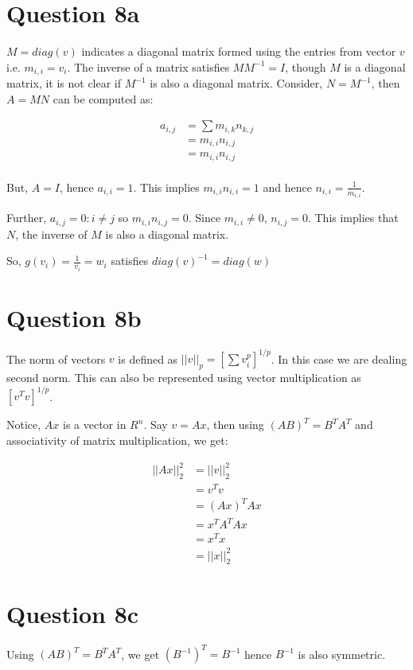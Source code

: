 \documentclass{article}
\begin{document}
    \section*{Question 8a}
    $M = diag(v)$ indicates a diagonal matrix formed using the entries from vector $v$ i.e. $m_{i,i} = v_i$. The inverse of a matrix satisfies $MM^{-1} = I$, though $M$ is a diagonal matrix, it is not clear if $M^{-1}$ is also a diagonal matrix. Consider, $N = M^{-1}$, then $A = MN$ can be computed as:

    \begin{align*}
        a_{i,j} &= \sum m_{i,k}n_{k,j} \\
                &= m_{i,i}n_{i,j} \\
                &= m_{i,i}n_{i,j} \\
    \end{align*}

    But, $A = I$, hence $a_{i, i} = 1$. This implies $m_{i, i}n_{i, i} = 1$ and hence $n_{i, i} = \frac{1}{m_{i,i}}$.
    
    Further, $a_{i,j} = 0 : i \neq j$ so $m_{i, i}n_{i, j} = 0$. Since $m_{i, i} \neq 0$, $n_{i, j} = 0$. This implies that $N$, the inverse of $M$ is also a diagonal matrix.

    So, $g(v_i) = \frac{1}{v_i} = w_i$ satisfies $diag(v)^{-1} = diag(w)$

    \section*{Question 8b}
    The norm of vectors $v$ is defined as $||v||_p = [\sum v_i^{p}]^{1/p}$. In this case we are dealing second norm. This can also be represented using vector multiplication as $[v^{T}v]^{1/p}$.
    
    Notice, $Ax$ is a vector in $R^n$. Say $v = Ax$, then using $(AB)^{T} = B^TA^T$ and associativity of matrix multiplication, we get:

    \begin{align*}
        ||Ax||_2^2  &= ||v||_2^2 \\
                    &= v^{T}v \\
                    &= (Ax)^{T}Ax \\
                    &= x^{T}A^{T}Ax \\
                    &= x^{T}x \\
                    &= ||x||_2^2
    \end{align*}

    \section*{Question 8c}
    Using $(AB)^T = B^TA^T$, we get $(B^{-1})^T = B^{-1}$ hence $B^{-1}$ is also symmetric.
\end{document}
